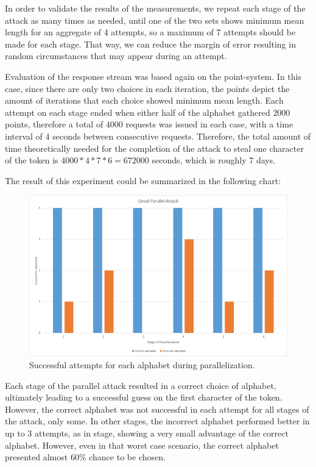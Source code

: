 In order to validate the results of the measurements, we repeat each stage of
the attack as many times as needed, until one of the two sets shows minimum mean
length for an aggregate of 4 attempts, so a maximum of 7 attempts should be made
for each stage. That way, we can reduce the margin of
error resulting in random circumstances that may appear during an attempt.

Evaluation of the response stream was based again on the point-system. In this
case, since there are only two choices in each iteration, the points depict the
amount of iterations that each choice showed minimum mean length. Each attempt
on each stage ended when either half of the alphabet gathered
\begin{math}2000\end{math} points, therefore a total of
\begin{math}4000\end{math} requests was issued in each case, with a time
interval of 4 seconds between consecutive requests. Therefore, the
total amount of time theoretically needed for the completion of the attack to
steal one character of the token is \begin{math}4000*4*7*6 = 672000\end{math}
seconds, which is roughly 7 days.

The result of this experiment could be summarized in the following chart:

\begin{figure}[H] \caption{Successful attempts for each alphabet during parallelization.}
\includegraphics[width=1\textwidth]{diagrams/gmail_parallel.png}\end{figure}

Each stage of the parallel attack resulted in a correct choice of alphabet,
ultimately leading to a successful guess on the first character of the token.
However, the correct alphabet was not successful in each attempt for all stages
of the attack, only some. In other stages, the incorrect alphabet performed
better in up to 3 attempts, as in stage, showing a very small advantage
of the correct alphabet. However, even in that worst case scenario, the
correct alphabet presented almost 60\% chance to be chosen.

